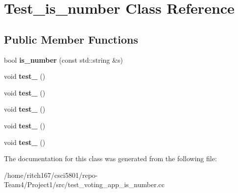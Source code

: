 \hypertarget{classTest__is__number}{}\section{Test\+\_\+is\+\_\+number Class Reference}
\label{classTest__is__number}
\subsection*{Public Member Functions}
\begin{DoxyCompactItemize}
\item 
\mbox{\label{classTest__is__number_a1950afb04ae3be5d8a6898692766eba7}} 
bool {\bfseries is\+\_\+number} (const std\+::string \&s)
\item 
\mbox{\label{classTest__is__number_a71ea66f73fe61c1b5173c4ee8e12092d}} 
void {\bfseries test\+\_} ()
\item 
\mbox{\label{classTest__is__number_af2c3f1c8db4d03ba417ccf26dbde6757}} 
void {\bfseries test\+\_} ()
\item 
\mbox{\label{classTest__is__number_a69a1338ffcb56e80ebd8c9310ff7ae5b}} 
void {\bfseries test\+\_} ()
\item 
\mbox{\label{classTest__is__number_abf1bba6a79b5153a6f16f543b410522a}} 
void {\bfseries test\+\_} ()
\item 
\mbox{\label{classTest__is__number_abc352e7d5ee72c727dd5011fdf934351}} 
void {\bfseries test\+\_} ()
\end{DoxyCompactItemize}


The documentation for this class was generated from the following file\+:\begin{DoxyCompactItemize}
\item 
/home/ritch167/csci5801/repo-\/\+Team4/\+Project1/src/test\+\_\+voting\+\_\+app\+\_\+is\+\_\+number.\+cc\end{DoxyCompactItemize}
